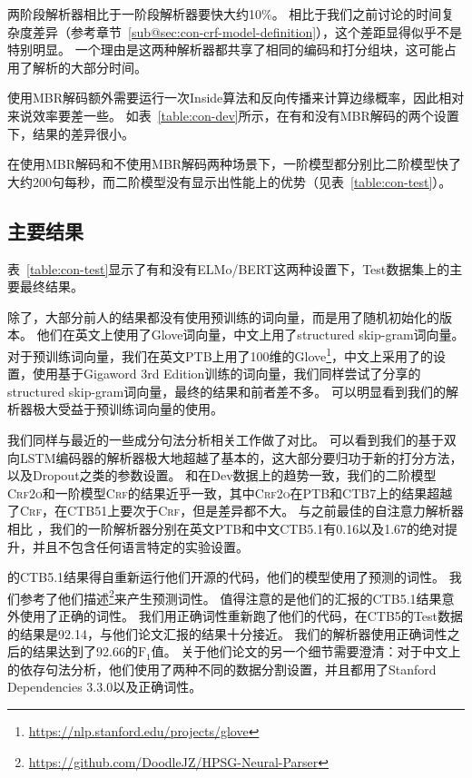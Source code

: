 两阶段解析器相比于一阶段解析器要快大约10\%。
相比于我们之前讨论的时间复杂度差异（参考章节~\ref{sub@sec:con-crf-model-definition}），这个差距显得似乎不是特别明显。
一个理由是这两种解析器都共享了相同的编码和打分组块，这可能占用了解析的大部分时间。

使用MBR解码额外需要运行一次Inside算法和反向传播来计算边缘概率，因此相对来说效率要差一些。
如表~\ref{table:con-dev}所示，在有和没有MBR解码的两个设置下，结果的差异很小。

在使用MBR解码和不使用MBR解码两种场景下，一阶模型都分别比二阶模型快了大约200句每秒，而二阶模型没有显示出性能上的优势（见表~\ref{table:con-test}）。



\subsection{主要结果}
表~\ref{table:con-test}显示了有和没有ELMo/BERT这两种设置下，Test数据集上的主要最终结果。

除了\citet{zhou-zhao-2019-head}，大部分前人的结果都没有使用预训练的词向量，而是用了随机初始化的版本。
他们在英文上使用了Glove词向量，中文上用了structured skip-gram词向量。
对于预训练词向量，我们在英文PTB上用了100维的Glove\footnote{\url{https://nlp.stanford.edu/projects/glove}}，中文上采用了\citet{li-etal-2019-attentive}的设置，使用基于Gigaword 3rd Edition训练的词向量，我们同样尝试了\citet{zhou-zhao-2019-head}分享的structured skip-gram词向量，最终的结果和前者差不多。
可以明显看到我们的解析器极大受益于预训练词向量的使用。

我们同样与最近的一些成分句法分析相关工作做了对比。
可以看到我们的基于双向LSTM编码器的解析器极大地超越了基本的\citet{stern-etal-2017-minimal}，这大部分要归功于新的打分方法，以及Dropout之类的参数设置。
和在Dev数据上的趋势一致，我们的二阶模型\textsc{Crf2o}和一阶模型\textsc{Crf}的结果近乎一致，其中\textsc{Crf2o}在PTB和CTB7上的结果超越了\textsc{Crf}，在CTB51上要次于\textsc{Crf}，但是差异都不大。
与之前最佳的自注意力解析器相比 \citep{kitaev-klein-2018-constituency}，我们的一阶解析器分别在英文PTB和中文CTB5.1有0.16以及1.67的绝对提升，并且不包含任何语言特定的实验设置。

\citet{zhou-zhao-2019-head}的CTB5.1结果得自重新运行他们开源的代码，他们的模型使用了预测的词性。
我们参考了他们描述\footnote{\url{https://github.com/DoodleJZ/HPSG-Neural-Parser}}来产生预测词性。
值得注意的是他们的汇报的CTB5.1结果意外使用了正确的词性。
我们用正确词性重新跑了他们的代码，在CTB5的Test数据的结果是92.14，与他们论文汇报的结果十分接近。
我们的解析器使用正确词性之后的结果达到了92.66的$\mathrm{F}_1$值。
关于他们论文的另一个细节需要澄清：对于中文上的依存句法分析，他们使用了两种不同的数据分割设置，并且都用了Stanford Dependencies 3.3.0以及正确词性。

